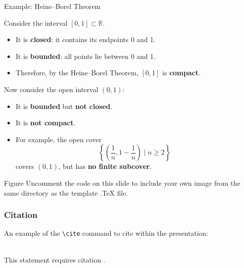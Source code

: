 \documentclass[aspectratio=169,xcolor=dvipsnames]{beamer}
\begin{document}
\begin{frame}{Example: Heine--Borel Theorem}
    \begin{example}
        Consider the interval $[0, 1] \subset \mathbb{R}$.

        \begin{itemize}
            \item It is \textbf{closed}: it contains its endpoints 0 and 1.
            \item It is \textbf{bounded}: all points lie between 0 and 1.
            \item Therefore, by the Heine--Borel Theorem, $[0,1]$ is \textbf{compact}.
        \end{itemize}

        Now consider the open interval $(0, 1)$:
        \begin{itemize}
            \item It is \textbf{bounded} but \textbf{not closed}.
            \item It is \textbf{not compact}.
            \item For example, the open cover 
            \[
                \left\{ \left( \frac{1}{n}, 1 - \frac{1}{n} \right) \mid n \geq 2 \right\}
            \]
            covers $(0,1)$, but has \textbf{no finite subcover}.
        \end{itemize}
    \end{example}
\end{frame}


\begin{frame}{Figure}
    Uncomment the code on this slide to include your own image from the same directory as the template .TeX file.
\end{frame}


\begin{frame}[fragile] %
    \frametitle{Citation}
    An example of the \verb|\cite| command to cite within the presentation:\\~

    This statement requires citation \cite{a1}.
\end{frame}
\end{document}
